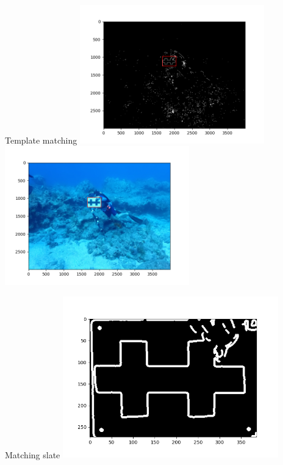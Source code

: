 \begin{frame}{Template matching}
    \centering
    \includegraphics[height=0.6\textheight,width=0.6\textwidth,keepaspectratio]{images/fs_rectangle_contours.png}
    \includegraphics[height=0.6\textheight,width=0.6\textwidth,keepaspectratio]{images/fs_rectangle_real.png}
\end{frame}

\begin{frame}{Matching slate}
    \centering
    \includegraphics[height=0.7\textheight,width=0.7\textwidth,keepaspectratio]{images/fs_contours_cropped.png}
\end{frame}

